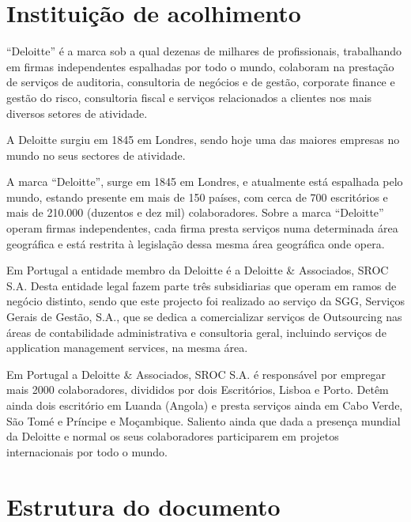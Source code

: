 \section{Instituição de acolhimento}

\par “Deloitte” é a marca sob a qual dezenas de milhares de profissionais, trabalhando em firmas independentes espalhadas por todo o mundo, colaboram na prestação de serviços de auditoria, consultoria de negócios e de gestão, corporate finance e gestão do risco, consultoria fiscal e serviços relacionados a clientes nos mais diversos setores de atividade.
\par A Deloitte surgiu em 1845 em Londres, sendo hoje uma das maiores empresas no mundo no seus sectores de atividade.
\par A marca “Deloitte”, surge em 1845 em Londres, e atualmente está espalhada pelo mundo, estando presente em mais de 150 países, com cerca de 700 escritórios e mais de 210.000 (duzentos e dez mil) colaboradores. Sobre a marca “Deloitte” operam firmas independentes, cada firma presta serviços numa determinada área geográfica e está restrita à legislação dessa mesma área geográfica onde opera.
\par Em Portugal a entidade membro da Deloitte é a Deloitte \& Associados, SROC S.A. Desta entidade legal fazem parte três subsidiarias que operam em ramos de negócio distinto, sendo que este projecto foi realizado ao serviço da SGG, Serviços Gerais de Gestão, S.A., que se dedica a comercializar serviços de Outsourcing nas áreas de contabilidade administrativa e consultoria geral, incluindo serviços de application management services,  na mesma área.
\par Em Portugal a Deloitte \& Associados, SROC S.A. é responsável por empregar mais  2000 colaboradores, divididos por dois Escritórios, Lisboa e Porto. Detêm ainda dois escritório em Luanda (Angola) e presta serviços ainda em Cabo Verde, São Tomé e Príncipe e Moçambique. Saliento ainda que dada a presença mundial da Deloitte e normal os seus colaboradores participarem em projetos internacionais por todo o mundo.


\section{Estrutura do documento}

